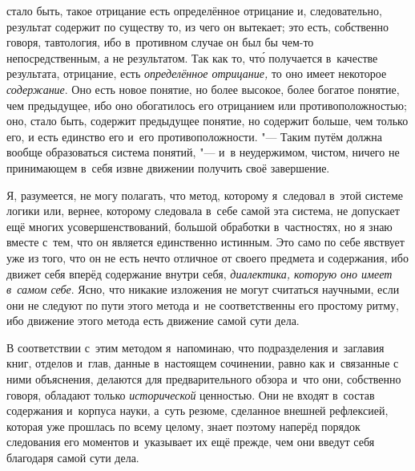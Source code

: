 стало быть, такое отрицание есть определённое отрицание и, следовательно,
результат содержит по существу то, из чего он вытекает; это есть, собственно
говоря, тавтология, ибо в~противном случае он был бы чем-то непосредственным,
а не результатом. Так как то, чт\'{о} получается в~качестве результата,
отрицание, есть {\em определённое отрицание,}
то оно имеет некоторое {\em содержание}. Оно есть новое
понятие, но более высокое, более богатое понятие, чем предыдущее, ибо оно
обогатилось его отрицанием или противоположностью; оно, стало быть,
содержит предыдущее понятие, но содержит больше, чем только его,
и есть единство его и~его противоположности. "--- Таким путём должна
вообще образоваться система понятий, "--- и~в неудержимом, чистом, ничего не
принимающем в~себя извне движении получить своё завершение.

Я, разумеется, не могу полагать, что метод, которому я~следовал в~этой
системе логики или, вернее, которому следовала в~себе самой эта система, не
допускает ещё многих усовершенствований, большой обработки в~частностях, но
я знаю вместе с~тем, что он является единственно истинным. Это само по себе
явствует уже из того, что он не есть нечто отличное от своего предмета и
содержания, ибо движет себя вперёд содержание внутри себя,
{\em диалектика, которую оно имеет в~самом себе}. Ясно,
что никакие изложения не могут считаться научными, если они не следуют по
пути этого метода и~не соответственны его простому ритму, ибо движение
этого метода есть движение самой сути дела.

В соответствии с~этим методом я~напоминаю, что подразделения и~заглавия
книг, отделов и~глав, данные в~настоящем сочинении, равно как и~связанные с
ними объяснения, делаются для предварительного обзора и~что они, собственно
говоря, обладают только {\em исторической} ценностью.
Они не входят в~состав содержания и~корпуса науки, а~суть резюме, сделанное
внешней рефлексией, которая уже прошлась по всему целому, знает поэтому
наперёд порядок следования его моментов и~указывает их ещё прежде, чем они
введут себя благодаря самой сути дела.

